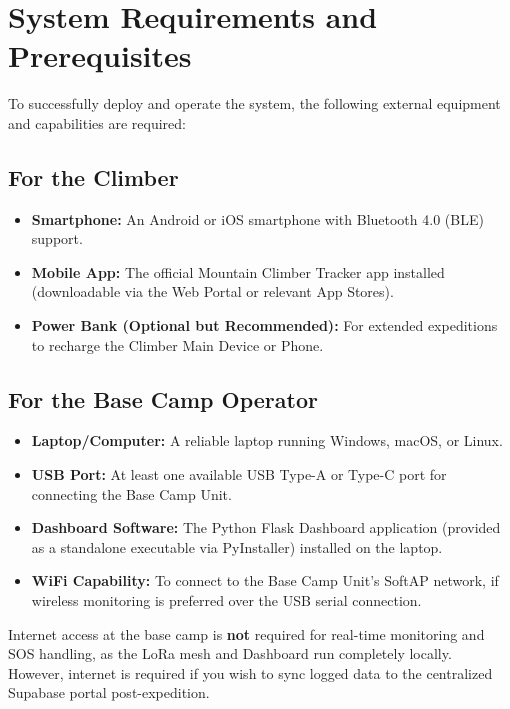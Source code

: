 \section{System Requirements and Prerequisites}

To successfully deploy and operate the system, the following external equipment and capabilities are required:

\subsection{For the Climber}
\begin{itemize}
    \item \textbf{Smartphone:} An Android or iOS smartphone with Bluetooth 4.0 (BLE) support.
    \item \textbf{Mobile App:} The official Mountain Climber Tracker app installed (downloadable via the Web Portal or relevant App Stores).
    \item \textbf{Power Bank (Optional but Recommended):} For extended expeditions to recharge the Climber Main Device or Phone.
\end{itemize}

\subsection{For the Base Camp Operator}
\begin{itemize}
    \item \textbf{Laptop/Computer:} A reliable laptop running Windows, macOS, or Linux.
    \item \textbf{USB Port:} At least one available USB Type-A or Type-C port for connecting the Base Camp Unit.
    \item \textbf{Dashboard Software:} The Python Flask Dashboard application (provided as a standalone executable via PyInstaller) installed on the laptop.
    \item \textbf{WiFi Capability:} To connect to the Base Camp Unit's SoftAP network, if wireless monitoring is preferred over the USB serial connection.
\end{itemize}

\begin{infobox}
Internet access at the base camp is \textbf{not} required for real-time monitoring and SOS handling, as the LoRa mesh and Dashboard run completely locally. However, internet is required if you wish to sync logged data to the centralized Supabase portal post-expedition.
\end{infobox}
